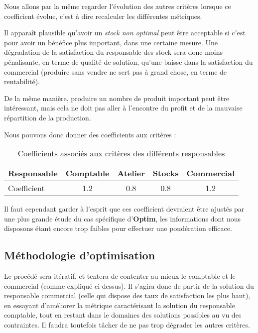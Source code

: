 Nous allons par la même regarder l'évolution des autres critères lorsque ce
coefficient évolue, c'est à dire recalculer les différentes métriques.

Il apparaît plausible qu'avoir un \emph{stock non optimal} peut être acceptable
si c'est pour avoir un bénéfice plus important, dans une certaine mesure. Une
dégradation de la satisfaction du responsable des stock sera donc moins
pénalisante, en terme de qualité de solution, qu'une baisse dans la satisfaction
du commercial (produire sans vendre ne sert pas à grand chose, en terme de
rentabilité).

De la même manière, produire un nombre de produit important peut être
intéressant, mais cela ne doit pas aller à l'encontre du profit et de la
mauvaise répartition de la production.

Nous pouvons donc donner des coefficients aux critères :

\begin{table}[h!]
\begin{center}
\begin{tabular}{|l||c|c|c|c|}
\hline
    Responsable & Comptable & Atelier &  Stocks & Commercial  \\
	\hline
    Coefficient & 1.2	    & 0.8     & 0.8	& 1.2 \\
	\hline
	\end{tabular}
	\end{center}
\caption{Coefficients associés aux critères des différents responsables}
\end{table}

Il faut cependant garder à l'esprit que ces coefficient devraient être ajustés
par une plus grande étude du cas spécifique d'\textbf{Optim}, les informations
dont nous disposons étant encore trop faibles pour effectuer une pondération
efficace.

\subsection{Méthodologie d'optimisation}
Le procédé sera itératif, et tentera de contenter au mieux le comptable et le
commercial (comme expliqué ci-dessus). Il s'agira donc de partir de la solution
du responsable commercial (celle qui dispose des taux de satisfaction les plus
haut), en essayant d'améliorer la métrique caractérisant la solution du
responsable comptable, tout en restant dans le domaines des solutions possibles
au vu des contraintes. Il faudra toutefois tâcher de ne pas trop dégrader les
autres critères.

